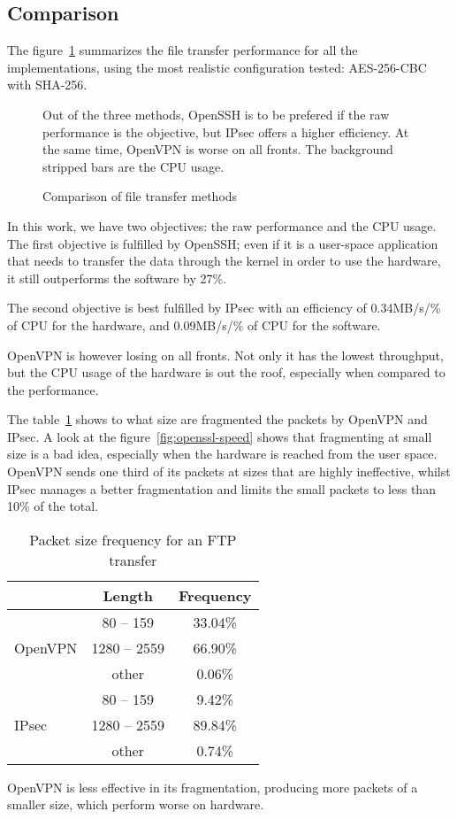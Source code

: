 \subsection{Comparison}
The figure~\ref{fig:ftp-bench-comparison} summarizes the file transfer performance for all the implementations, using the most realistic configuration tested: AES-256-CBC with SHA-256.
\begin{figure}[ht]

\caption{Comparison of file transfer methods}{Out of the three methods, OpenSSH is to be prefered if the raw performance is the objective, but IPsec offers a higher efficiency. At the same time, OpenVPN is worse on all fronts. The background stripped bars are the CPU usage.}
\label{fig:ftp-bench-comparison}
\end{figure}

In this work, we have two objectives: the raw performance and the CPU usage.
The first objective is fulfilled by OpenSSH; even if it is a user-space application that needs to transfer the data through the kernel in order to use the hardware, it still outperforms the software by 27\%.

\noindent The second objective is best fulfilled by IPsec with an efficiency of 0.34MB/s/\% of CPU for the hardware, and 0.09MB/s/\% of CPU for the software.

OpenVPN is however losing on all fronts. Not only it has the lowest throughput, but the CPU usage of the hardware is out the roof, especially when compared to the performance.

\noindent The table~\ref{tab:ftp-fragmentation} shows to what size are fragmented the packets by OpenVPN and IPsec.
A look at the figure~\ref{fig:openssl-speed} shows that fragmenting at small size is a bad idea, especially when the hardware is reached from the user space.
OpenVPN sends one third of its packets at sizes that are highly ineffective, whilst IPsec manages a better fragmentation and limits the small packets to less than 10\% of the total.

\begin{table}
\center
\begin{tabular}{l|c|c|} \cline{2-3}
 & Length & Frequency \\ \hline
\multicolumn{1}{|l|}{\multirow{3}{*}{OpenVPN}} & 80 -- 159 & 33.04\% \\ \cline{2-3}
\multicolumn{1}{|l|}{} & 1280 -- 2559 & 66.90\% \\ \cline{2-3}
\multicolumn{1}{|l|}{} & other & 0.06\% \\ \hline
\multicolumn{1}{|l|}{\multirow{3}{*}{IPsec}} & 80 -- 159 & 9.42\% \\ \cline{2-3}
\multicolumn{1}{|l|}{} & 1280 -- 2559 & 89.84\% \\ \cline{2-3}
\multicolumn{1}{|l|}{} & other & 0.74\% \\ \hline
\end{tabular}
\caption{Packet size frequency for an FTP transfer}{OpenVPN is less effective in its fragmentation, producing more packets of a smaller size, which perform worse on hardware.}
\label{tab:ftp-fragmentation}
\end{table}


